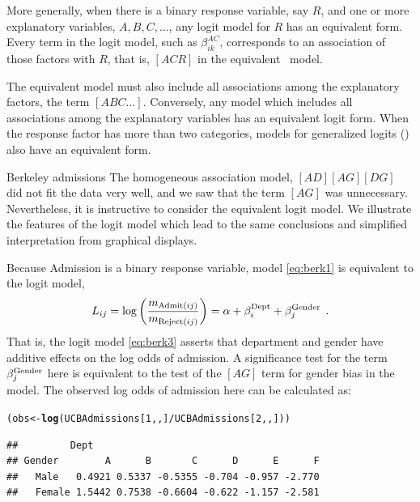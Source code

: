 \documentclass[11pt]{book}\usepackage[]{graphicx}\usepackage[]{color}
\makeatletter
\newcommand{\hlnum}[1]{\textcolor[rgb]{0.686,0.059,0.569}{#1}}%
\newcommand{\hlopt}[1]{\textcolor[rgb]{0,0,0}{#1}}%
\newcommand{\hlstd}[1]{\textcolor[rgb]{0.345,0.345,0.345}{#1}}%
\newcommand{\hlkwb}[1]{\textcolor[rgb]{0.69,0.353,0.396}{#1}}%
\newcommand{\hlkwd}[1]{\textcolor[rgb]{0.737,0.353,0.396}{\textbf{#1}}}%
\newenvironment{kframe}{%
 \def\at@end@of@kframe{}%
 \ifinner\ifhmode%
  \def\at@end@of@kframe{\end{minipage}}%
  \begin{minipage}{\columnwidth}%
 \fi\fi%
 \def\FrameCommand##1{\hskip\@totalleftmargin \hskip-\fboxsep
 \colorbox{shadecolor}{##1}\hskip-\fboxsep
     \hskip-\linewidth \hskip-\@totalleftmargin \hskip\columnwidth}%
 \MakeFramed {\advance\hsize-\width
   \@totalleftmargin\z@ \linewidth\hsize
   \@setminipage}}%
 {\par\unskip\endMakeFramed%
 \at@end@of@kframe}
\newenvironment{knitrout}{}{} %
\renewenvironment{knitrout}{\small\renewcommand{\baselinestretch}{.85}}{} %
\makeatother
\begin{document}
More generally, when there is a binary response variable, say $R$, and
one or more explanatory variables, $A, B, C, \dots$, any logit model
for $R$ has an equivalent \loglin form.
Every term in the logit model, such as $\beta_{ik}^{AC}$, corresponds to
an association of those factors with $R$, that is, $[ACR]$ in the
equivalent \loglin\ model.

The equivalent \loglin model must also include all
associations among the explanatory factors, the term $[A B C \dots]$.
Conversely, any \loglin model which includes all associations among
the explanatory variables has an equivalent logit form.
When the response factor has more than two categories, models for
generalized logits () also
have an equivalent \loglin form.

\begin{Example}[berkeley7]{Berkeley admissions}
The homogeneous association model, $[AD] [AG] [DG]$
did not fit the  data very well,
and we saw that the term $[AG]$ was unnecessary.
Nevertheless, it is instructive to consider the equivalent logit model.
We illustrate the features of the logit model which lead to the same
conclusions and simplified interpretation from graphical displays.

Because Admission
is a binary response variable, model \eqref{eq:berk1} is equivalent
to the logit model,
\begin{equation}\label{eq:berk3}
  L_{ij} =
  \log \left(
  \frac{m_{ \mbox{\scriptsize{Admit}} (ij) }} {m_{ \mbox{\scriptsize{Reject}} (ij) }}
  \right)
  =
  \alpha   +  \beta _i^{\mbox{\scriptsize Dept}}
  +  \beta _j^{\mbox{\scriptsize Gender}}
  \:\: .
\end{equation}
That is, the logit model \eqref{eq:berk3} asserts that department and
gender have additive effects on the log odds of admission.
A significance test for the term $\beta _j^{\mbox{\scriptsize Gender}}$
here is equivalent to the test
of the $[AG]$ term for gender bias in the \loglin model.
The observed log odds of admission here can be calculated as:
\begin{knitrout}
\color{fgcolor}\begin{kframe}
\begin{alltt}
\hlstd{(obs} \hlkwb{<-} \hlkwd{log}\hlstd{(UCBAdmissions[}\hlnum{1}\hlstd{,,]} \hlopt{/} \hlstd{UCBAdmissions[}\hlnum{2}\hlstd{,,]))}
\end{alltt}
\begin{verbatim}
##         Dept
## Gender        A      B       C      D      E      F
##   Male   0.4921 0.5337 -0.5355 -0.704 -0.957 -2.770
##   Female 1.5442 0.7538 -0.6604 -0.622 -1.157 -2.581
\end{verbatim}
\end{kframe}
\end{knitrout}



\end{Example}
\end{document}
